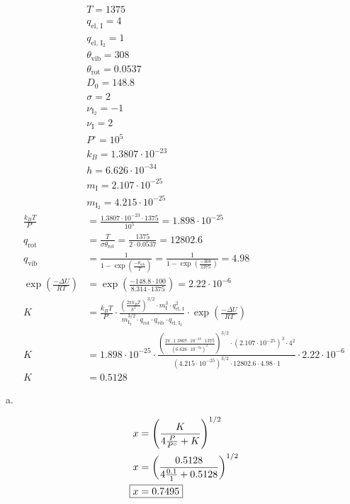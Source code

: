 \documentclass[12pt]{article}
\begin{document}
\begin{enumerate}
    \begin{align*}
        & T = 1375 \\
        & q_{\text{el, I}} = 4 \\
        & q_{\text{el, I$_2$}} = 1 \\
        & \theta_{\text{vib}} = 308 \\
        & \theta_{\text{rot}} = 0.0537 \\
        & D_0 = 148.8 \\
        & \sigma = 2 \\
        & \nu_{\text{I}_2} = -1 \\
        & \nu_{\text{I}} = 2 \\
        & P^\circ = 10^5 \\
        & k_B = 1.3807\cdot10^{-23} \\
        & h = 6.626\cdot10^{-34} \\
        & m_\text{I} = 2.107\cdot10^{-25} \\
        & m_{\text{I$_2$}} = 4.215\cdot10^{-25} \\
        \frac{k_B T}{P^\circ} &= \frac{1.3807\cdot10^{-23} \cdot 1375}{10^5} = 1.898\cdot10^{-25} \\
        q_{\text{rot}} &= \frac{T}{\sigma \theta_{\text{rot}}} = \frac{1375}{2\cdot0.0537} = 12802.6 \\
        q_{\text{vib}} &= \frac{1}{1-\exp\left(\frac{-\theta_{\text{vib}}}{T}\right)} = \frac{1}{1-\exp\left(\frac{-308}{1375}\right)} = 4.98 \\
        \exp\left(\frac{-\Delta U}{RT}\right) &= \exp\left(\frac{-148.8\cdot100}{8.314\cdot1375}\right) = 2.22\cdot10^{-6} \\
        K &= \frac{k_B T}{P^\circ} \cdot \frac{\left(\frac{2\pi k_B T}{h^2}\right)^{3/2} \cdot m_\text{I}^3 \cdot q_{\text{el, I}}^2}{m_{\text{I$_2$}}^{3/2} \cdot q_{\text{rot}} \cdot q_{\text{vib}} \cdot q_{\text{el, I$_2$}}} \cdot \exp\left(\frac{-\Delta U}{RT}\right) \\
        K &= 1.898\cdot10^{-25} \cdot \frac{\left(\frac{2\pi \cdot 1.3807\cdot10^{-23} \cdot 1375}{\left(6.626\cdot10^{-34}\right)^2}\right)^{3/2} \cdot \left(2.107\cdot10^{-25}\right)^3 \cdot 4^2}{\left(4.215\cdot10^{-25}\right)^{3/2} \cdot 12802.6 \cdot 4.98 \cdot 1} \cdot 2.22\cdot10^{-6} \\
        K &= 0.5128
    \end{align*}

    a.

    \begin{align*}
        x &= \left(\frac{K}{4\frac{P}{P^\circ}+K}\right)^{1/2} \\
        x &= \left(\frac{0.5128}{4\frac{0.1}{1}+0.5128}\right)^{1/2} \\
        \Aboxed{x &= 0.7495}
    \end{align*}


\end{enumerate}
\end{document}
